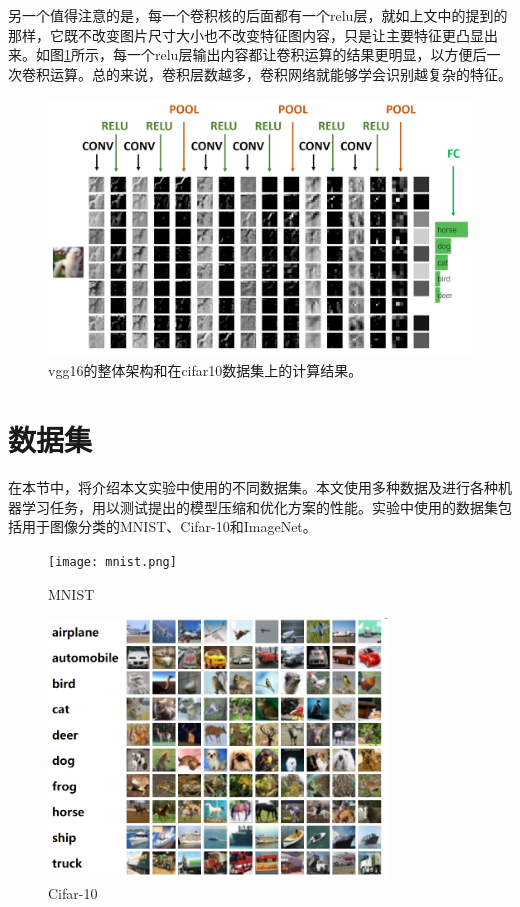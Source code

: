 另一个值得注意的是，每一个卷积核的后面都有一个relu层，就如上文中的提到的那样，它既不改变图片尺寸大小也不改变特征图内容，只是让主要特征更凸显出来。如图\ref{framework}所示，每一个relu层输出内容都让卷积运算的结果更明显，以方便后一次卷积运算。总的来说，卷积层数越多，卷积网络就能够学会识别越复杂的特征。
\begin{figure}[ht]
	\centering
	\includegraphics[width=1\textwidth]{figures/vggResult.png}
	\caption{vgg16的整体架构和在cifar10数据集上的计算结果。}
	\label{framework}
\end{figure}

\section{数据集}

在本节中，将介绍本文实验中使用的不同数据集。本文使用多种数据及进行各种机器学习任务，用以测试提出的模型压缩和优化方案的性能。实验中使用的数据集包括用于图像分类的MNIST、Cifar-10和ImageNet。

\begin{figure}[]
    \centering
    \texttt{[image: mnist.png]}	%
    \caption{MNIST}
    \label{fig:mnist} %
\end{figure}

\begin{figure}[]
    \centering
    \includegraphics[width=0.8\textwidth]{cifar10.png}	%
    \caption{Cifar-10}
    \label{fig:cifar10} %
\end{figure}

